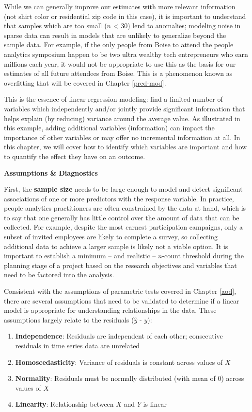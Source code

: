\documentclass[
]{book}
\providecommand{\tightlist}{%
  \setlength{\itemsep}{0pt}\setlength{\parskip}{0pt}}
\begin{document}
While we can generally improve our estimates with more relevant information (not shirt color or residential zip code in this case), it is important to understand that samples which are too small (\(n\) \textless{} 30) lend to anomalies; modeling noise in sparse data can result in models that are unlikely to generalize beyond the sample data. For example, if the only people from Boise to attend the people analytics symposium happen to be two ultra wealthy tech entrepreneurs who earn millions each year, it would not be appropriate to use this as the basis for our estimates of all future attendees from Boise. This is a phenomenon known as overfitting that will be covered in Chapter \ref{pred-mod}.

This is the essence of linear regression modeling: find a limited number of variables which independently and/or jointly provide significant information that helps explain (by reducing) variance around the average value. As illustrated in this example, adding additional variables (information) can impact the importance of other variables or may offer no incremental information at all. In this chapter, we will cover how to identify which variables are important and how to quantify the effect they have on an outcome.

\textbf{Assumptions \& Diagnostics}

First, the \textbf{sample size} needs to be large enough to model and detect significant associations of one or more predictors with the response variable. In practice, people analytics practitioners are often constrained by the data at hand, which is to say that one generally has little control over the amount of data that can be collected. For example, despite the most earnest participation campaigns, only a subset of invited employees are likely to complete a survey, so collecting additional data to achieve a larger sample is likely not a viable option. It is important to establish a minimum -- and realistic -- \(n\)-count threshold during the planning stage of a project based on the research objectives and variables that need to be factored into the analysis.

Consistent with the assumptions of parametric tests covered in Chapter \ref{aod}, there are several assumptions that need to be validated to determine if a linear model is appropriate for understanding relationships in the data. These assumptions largely relate to the residuals (\(\hat{y}\) - \(y\)):

\begin{enumerate}
\def\labelenumi{\arabic{enumi}.}
\tightlist
\item
  \textbf{Independence}: Residuals are independent of each other; consecutive residuals in time series data are unrelated
\item
  \textbf{Homoscedasticity}: Variance of residuals is constant across values of \(X\)
\item
  \textbf{Normality}: Residuals must be normally distributed (with mean of 0) across values of \(X\)
\item
  \textbf{Linearity}: Relationship between \(X\) and \(Y\) is linear
\end{enumerate}
\end{document}
